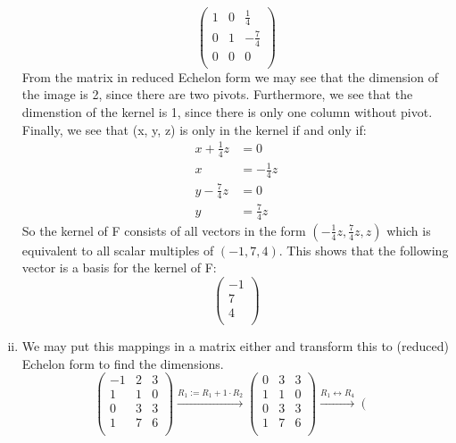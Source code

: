 \documentclass[a4paper]{article}
\begin{document}
\begin{enumerate}[i)]
\[        \left(
        \begin{array}{ccc}
        1 & 0 & \frac{1}{4} \\
        0 & 1 & - \frac{7}{4} \\
        0 & 0 & 0 \\
        \end{array}
        \right)
  \]
  From the matrix in reduced Echelon form we may see that the dimension of the image is 2, since there are two pivots. Furthermore, we see that the dimenstion of the kernel is 1, since there is only one column without pivot. Finally, we see that (x, y, z) is only in the kernel if and only if:
  \begin{align*}
    x + \frac{1}{4} z &= 0 \\
    x &= - \frac{1}{4} z \\
    y - \frac{7}{4} z &= 0 \\
    y &= \frac{7}{4} z
  \end{align*}
  So the kernel of F consists of all vectors in the form $(-\frac{1}{4}z, \frac{7}{4}z, z)$ which is equivalent to all scalar multiples of $(-1, 7, 4)$. This shows that the following vector is a basis for the kernel of F:
  \[
  \left(
  \begin{array}{c}
  -1 \\
  7 \\
  4 \\
  \end{array}
  \right)
  \]
  \item We may put this mappings in a matrix either and transform this to (reduced) Echelon form to find the dimensions.
  \[
  \left(
  \begin{array}{ccc}
  -1 & 2 & 3 \\
  1 & 1 & 0 \\
  0 & 3 & 3 \\
  1 & 7 & 6 \\
  \end{array}
  \right)
  \xrightarrow{\text{$R_1 := R_1 + 1 \cdot R_2$}}
  \left(
  \begin{array}{ccc}
  0 & 3 & 3 \\
  1 & 1 & 0 \\
  0 & 3 & 3 \\
  1 & 7 & 6 \\
  \end{array}
  \right)
  \xrightarrow{\text{$R_1 \leftrightarrow R_4$}}
  \left(
  \begin{array}{ccc}

\end{array}\]
\end{enumerate}
\end{document}
